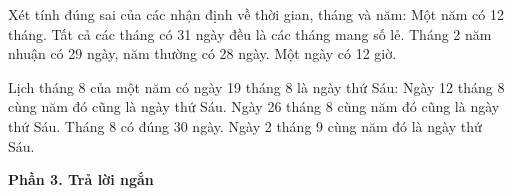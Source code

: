 \begin{ex} %
Xét tính đúng sai của các nhận định về thời gian, tháng và năm:
\choiceTF
{\True Một năm có 12 tháng.}
{Tất cả các tháng có 31 ngày đều là các tháng mang số lẻ.}
{\True Tháng 2 năm nhuận có 29 ngày, năm thường có 28 ngày.}
{Một ngày có 12 giờ.}
\end{ex}

\begin{ex} %
Lịch tháng 8 của một năm có ngày 19 tháng 8 là ngày thứ Sáu:
\choiceTF
{\True Ngày 12 tháng 8 cùng năm đó cũng là ngày thứ Sáu.}
{\True Ngày 26 tháng 8 cùng năm đó cũng là ngày thứ Sáu.}
{Tháng 8 có đúng 30 ngày.}
{\True Ngày 2 tháng 9 cùng năm đó là ngày thứ Sáu.}
\end{ex}

\textbf{Phần 3. Trả lời ngắn}


